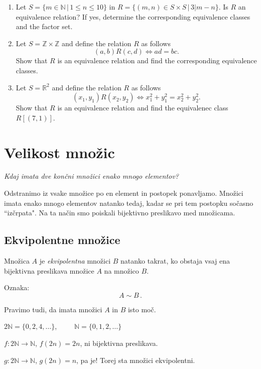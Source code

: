 \documentclass[11pt,paper=b5,footinclude,headinclude]{scrbook} %
\newcounter{example}
\begin{document}
\begin{enumerate}
\item Let $S= \{m\in \mathbb{N}\,|\, 1\leq n \leq 10\}$ in $R=\{(m,n)\in S\times S\,|\, 3|m-n\}$.
Is $R$ an equivalence relation? If yes, determine the corresponding equivalence classes and the factor set.

\item Let $S = \mathbb{Z}\times \mathbb{Z}$ and define the relation $R$ as follows
$$(a,b)R(c,d)\Leftrightarrow ad = bc.$$
Show that $R$ is an equivalence relation  and find the corresponding equivalence classes.

\item Let  $S =  \mathbb{R}^2$ and define the relation $R$ as follows
$$(x_1,y_1)R(x_2,y_2)\Leftrightarrow x_1^2 + y_1^2 = x_2^2 + y_2^2.$$
Show that $R$ is an equivalence relation  and find the equivalenec class $R[(7,1)]$.



\end{enumerate}


\chapter{Velikost množic}
{\em Kdaj imata dve končni množici enako mnogo elementov?

Odstranimo iz vsake množice po en element in postopek ponavljamo. Množici
imata enako mnogo elementov natanko tedaj, kadar se pri tem postopku sočasno ``izčrpata".
Na ta način smo poiskali bijektivno preslikavo med množicama.}
\section{Ekvipolentne množice}

Množica $A$ je {\em ekvipolentna} množici $B$ natanko takrat, ko obstaja vsaj ena bijektivna preslikava
množice $A$ na množico $B$.

Oznaka: $$A\sim B\,.$$

Pravimo tudi, da imata množici $A$ in $B$ isto moč.

\bigskip

\begin{example*}

$2\mathbb{N} = \{0,2,4,\ldots\}$,~~~~~$\mathbb{N} = \{0,1,2,\ldots\}$

$f: 2\mathbb{N} \to \mathbb{N}$, $f(2n) = 2n$, ni bijektivna preslikava.

$g: 2\mathbb{N} \to \mathbb{N}$, $g(2n) = n$, pa je! Torej sta množici ekvipolentni.\end{example*}
\end{document}
